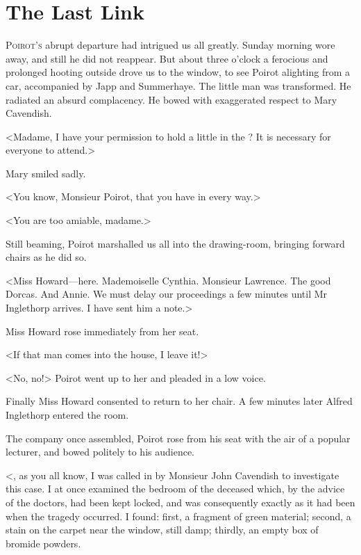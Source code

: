 \chapter{The Last Link} 

\lettrine{P}{oirot's} abrupt departure had intrigued us all greatly. Sunday morning wore away, and still he did not reappear. But about three o'clock a ferocious and prolonged hooting outside drove us to the window, to see Poirot alighting from a car, accompanied by Japp and Summerhaye. The little man was transformed. He radiated an absurd complacency. He bowed with exaggerated respect to Mary Cavendish. 

 <Madame, I have your permission to hold a little  in the ? It is necessary for everyone to attend.> 

 Mary smiled sadly. 

 <You know, Monsieur Poirot, that you have  in every way.> 

 <You are too amiable, madame.> 

 Still beaming, Poirot marshalled us all into the drawing-room, bringing forward chairs as he did so. 

 <Miss Howard—here. Mademoiselle Cynthia. Monsieur Lawrence. The good Dorcas. And Annie.  We must delay our proceedings a few minutes until Mr Inglethorp arrives. I have sent him a note.> 

 Miss Howard rose immediately from her seat. 

 <If that man comes into the house, I leave it!> 

 <No, no!> Poirot went up to her and pleaded in a low voice. 

 Finally Miss Howard consented to return to her chair. A few minutes later Alfred Inglethorp entered the room. 

 The company once assembled, Poirot rose from his seat with the air of a popular lecturer, and bowed politely to his audience. 

 <, as you all know, I was called in by Monsieur John Cavendish to investigate this case. I at once examined the bedroom of the deceased which, by the advice of the doctors, had been kept locked, and was consequently exactly as it had been when the tragedy occurred. I found: first, a fragment of green material; second, a stain on the carpet near the window, still damp; thirdly, an empty box of bromide powders. 

